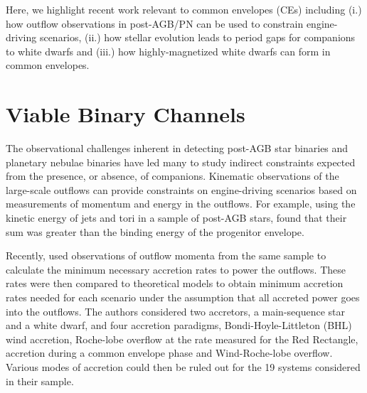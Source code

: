 \documentclass{iau_FM}
\begin{document}
Here, we highlight recent work relevant to common envelopes (CEs) including (i.) how outflow observations in post-AGB/PN can be used to constrain engine-driving scenarios, (ii.) how stellar evolution leads to period gaps for companions to white dwarfs and (iii.) how highly-magnetized white dwarfs can form in common envelopes.


\section{Viable Binary Channels}
The observational challenges inherent in detecting post-AGB star binaries and planetary nebulae binaries have led many to study indirect constraints expected from the presence, or absence, of companions.  Kinematic observations of the large-scale outflows can provide constraints on engine-driving scenarios based on measurements of momentum and energy in the outflows.  For example, using the kinetic energy of jets and tori in a sample of post-AGB stars, \cite{2012IAUS..283..188H} found that their sum was greater than the binding energy of the progenitor envelope.

Recently, \cite{BL2014} used observations of outflow momenta from the same sample to calculate the minimum necessary accretion rates to power the outflows.  These rates were then compared to theoretical models to obtain minimum accretion rates needed for each scenario under the assumption that all accreted power goes into the outflows.  The authors considered two accretors, a main-sequence star and a white dwarf, and four accretion paradigms, Bondi-Hoyle-Littleton (BHL) wind accretion, Roche-lobe overflow at the rate measured for the Red Rectangle, accretion during a common envelope phase and Wind-Roche-lobe overflow.  Various modes of accretion could then be ruled out for the 19 systems considered in their sample.  
\end{document}
